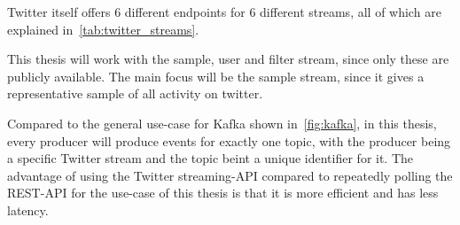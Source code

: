 Twitter itself offers 6 different endpoints for 6 different streams, all of which are explained in~\ref{tab:twitter_streams}.

\begin{table}
    \caption{All streams offered by Twitter~\cite{twitterDocs}}
    \label{tab:twitter_streams}
\end{table}

This thesis will work with the sample, user and filter stream, since only these are publicly available.
The main focus will be the sample stream, since it gives a representative sample of all activity on twitter.
\par
Compared to the general use-case for Kafka shown in~\ref{fig:kafka}, in this thesis,
every producer will produce events for exactly one topic, with the producer being a specific Twitter stream and the topic beint a unique identifier for it.
The advantage of using the Twitter streaming-API compared to repeatedly polling the REST-API for the use-case of this thesis
is that it is more efficient and has less latency.

